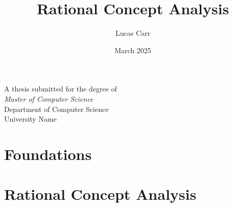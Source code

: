 \documentclass[12pt,a4paper]{report}
\title{Rational Concept Analysis}
\author{Lucas Carr}
\date{March 2025}
\begin{document}
\begin{titlepage}
  \centering
  \vspace*{4cm}
  {\Huge \bfseries \thetitle \par}
  \vspace{1.5cm}
  {\Large \theauthor \par}
  \vfill
  A thesis submitted for the degree of \\
  \textit{Master of Computer Science} \\
  Department of Computer Science \\
  University Name \\
  \vspace{1cm}
  \thedate
\end{titlepage}



\tableofcontents

\part{Foundations}



\part{Rational Concept Analysis}


\printbibliography

\printindex
\end{document}
